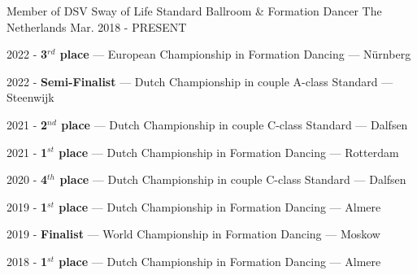 
\begin{cventries}




	\cventry
	{Member of DSV Sway of Life} %
	{Standard Ballroom \& Formation Dancer} %
	{The Netherlands} %
	{Mar. 2018 - PRESENT} %
	{
		\begin{cvitems} %
			\item {2022 - \textbf{3$^{rd}$ place} --- European Championship in Formation Dancing --- N\"urnberg}
			\item {2022 - \textbf{Semi-Finalist} --- Dutch Championship in couple A-class Standard --- Steenwijk}
			\item {2021 - \textbf{2$^{nd}$ place} --- Dutch Championship in couple C-class Standard --- Dalfsen}
			\item {2021 - \textbf{1$^{st}$ place} --- Dutch Championship in Formation Dancing --- Rotterdam}
			\item {2020 - \textbf{4$^{th}$ place} --- Dutch Championship in couple C-class Standard --- Dalfsen}
			\item {2019 - \textbf{1$^{st}$ place} --- Dutch Championship in Formation Dancing --- Almere}
			\item {2019 - \textbf{Finalist} --- World Championship in Formation Dancing --- Moskow}
			\item {2018 - \textbf{1$^{st}$ place} --- Dutch Championship in Formation Dancing --- Almere}
		\end{cvitems}
	}


\end{cventries}
